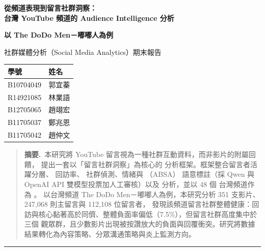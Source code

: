 \thispagestyle{empty}
\begin{center}
  {\bfseries\LARGE 從頻道表現到留言社群洞察：\\[2pt]
   台灣 YouTube 頻道的 Audience Intelligence 分析\par}
  \vspace{6pt}
  {\bfseries\large 以 The DoDo Men－嘟嘟人為例\par}
  \vspace{10pt}
  {\small 社群媒體分析（Social Media Analytics）期末報告\par}
  \vspace{14pt}

  \renewcommand{\arraystretch}{1.25}
  \begin{tabular}{ll}
    \toprule
    \textbf{學號} & \textbf{姓名}\\
    \midrule
    B10704049 & 郭宜蓁\\
    R14921085 & 林業語\\
    B12705065 & 趙翊宏\\
    B11705037 & 鄭兆恩\\
    B11705042 & 趙仲文\\
    \bottomrule
  \end{tabular}
\end{center}

\vspace{8pt}
\begin{quotation}
\noindent\small\textbf{摘要.}\ 本研究將 YouTube 留言視為一種社群互動資料，而非影片的附屬回饋，
提出一套以「留言社群洞察」為核心的  分析框架。框架整合留言者活躍分層、
回訪率、 社群偵測、情緒與 （ABSA）
語意標註（採 Qwen 與 OpenAI API 雙模型投票加人工審核）以及  分析，並以 48 個
台灣頻道作為 。
以台灣頻道 The DoDo Men－嘟嘟人為例，本研究分析 351 支影片、247{,}068 則主留言與 112{,}108 位留言者，
發現該頻道留言社群整體健康：回訪與核心黏著高於同儕、整體負面率偏低（7.5\%），但留言社群高度集中於三個
觀眾群，且少數影片出現被按讚放大的負面與回覆衝突。研究將數據結果轉化為內容策略、分眾溝通策略與炎上監測方向。
\end{quotation}

\vspace{4pt}
\hrule
\vspace{6pt}
